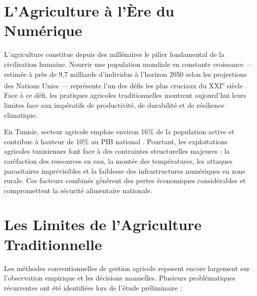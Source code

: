\documentclass[12pt, a4paper]{report}
\begin{document}
\section*{L'Agriculture à l'Ère du Numérique}

L'agriculture constitue depuis des millénaires le pilier fondamental de la civilisation humaine. Nourrir une population mondiale en constante croissance — estimée à près de 9,7 milliards d'individus à l'horizon 2050 selon les projections des Nations Unies — représente l'un des défis les plus cruciaux du XXI\textsuperscript{e} siècle \cite{fao2020}. Face à ce défi, les pratiques agricoles traditionnelles montrent aujourd'hui leurs limites face aux impératifs de productivité, de durabilité et de résilience climatique.

En Tunisie, secteur agricole emploie environ 16\% de la population active et contribue à hauteur de 10\% au PIB national \cite{ins2022}. Pourtant, les exploitations agricoles tunisiennes font face à des contraintes structurelles majeures : la raréfaction des ressources en eau, la montée des températures, les attaques parasitaires imprévisibles et la faiblesse des infrastructures numériques en zone rurale. Ces facteurs combinés génèrent des pertes économiques considérables et compromettent la sécurité alimentaire nationale.

\section*{Les Limites de l'Agriculture Traditionnelle}

Les méthodes conventionnelles de gestion agricole reposent encore largement sur l'observation empirique et les décisions manuelles. Plusieurs problématiques récurrentes ont été identifiées lors de l'étude préliminaire :
\end{document}
